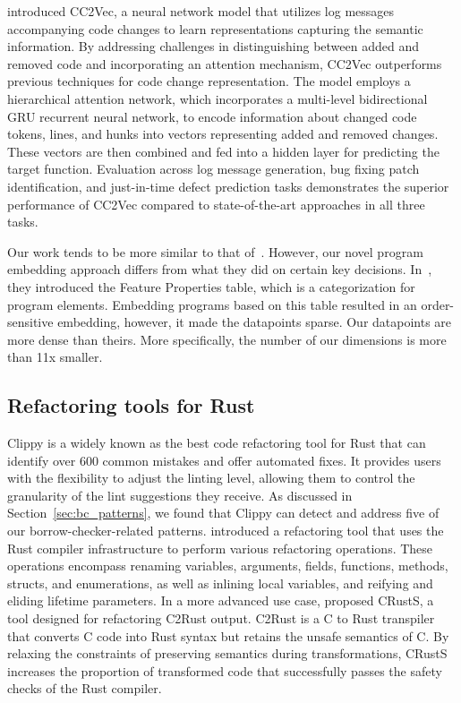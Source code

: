\cite{hoang2020cc2vec} introduced CC2Vec, a neural network model that utilizes log messages accompanying code changes to learn representations capturing the semantic information. By addressing challenges in distinguishing between added and removed code and incorporating an attention mechanism, CC2Vec outperforms previous techniques for code change representation. The model employs a hierarchical attention network, which incorporates a multi-level bidirectional GRU recurrent neural network, to encode information about changed code tokens, lines, and hunks into vectors representing added and removed changes. These vectors are then combined and fed into a hidden layer for predicting the target function. Evaluation across log message generation, bug fixing patch identification, and just-in-time defect prediction tasks demonstrates the superior performance of CC2Vec compared to state-of-the-art approaches in all three tasks.

Our work tends to be more similar to that of~\cite{hanam2016discovering}. However, our novel program embedding approach differs from what they did on certain key decisions. In~\cite{hanam2016discovering}, they introduced the Feature Properties table, which is a categorization for program elements. Embedding programs based on this table resulted in an order-sensitive embedding, however, it made the datapoints sparse. Our datapoints are more dense than theirs. More specifically, the number of our dimensions is more than 11x smaller.

\subsection{Refactoring tools for Rust}
Clippy is a widely known as the best code refactoring tool for Rust that can identify over 600 common mistakes and offer automated fixes. It provides users with the flexibility to adjust the linting level, allowing them to control the granularity of the lint suggestions they receive. As discussed in Section~\ref{sec:bc_patterns}, we found that Clippy can detect and address five of our borrow-checker-related patterns. \cite{sam2017automated} introduced a refactoring tool that uses the Rust compiler infrastructure to perform various refactoring operations. These operations encompass renaming variables, arguments, fields, functions, methods, structs, and enumerations, as well as inlining local variables, and reifying and eliding lifetime parameters. In a more advanced use case, \cite{ling2022rust} proposed CRustS, a tool designed for refactoring C2Rust output. C2Rust is a C to Rust transpiler that converts C code into Rust syntax but retains the unsafe semantics of C. By relaxing the constraints of preserving semantics during transformations, CRustS increases the proportion of transformed code that successfully passes the safety checks of the Rust compiler.

